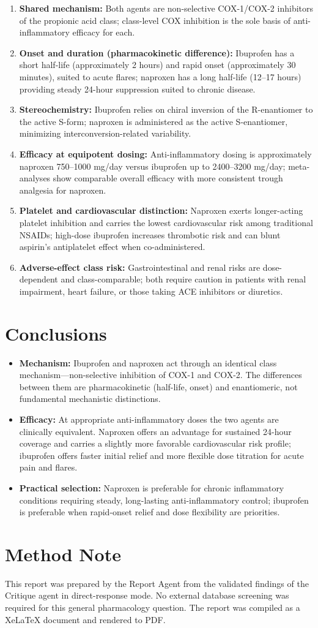 \documentclass[11pt]{article}
\begin{document}
\begin{enumerate}[leftmargin=1.6em]
\item \textbf{Shared mechanism:} Both agents are non-selective COX-1/COX-2 inhibitors of the propionic acid class; class-level COX inhibition is the sole basis of anti-inflammatory efficacy for each.
\item \textbf{Onset and duration (pharmacokinetic difference):} Ibuprofen has a short half-life (approximately 2 hours) and rapid onset (approximately 30 minutes), suited to acute flares; naproxen has a long half-life (12--17 hours) providing steady 24-hour suppression suited to chronic disease.
\item \textbf{Stereochemistry:} Ibuprofen relies on chiral inversion of the R-enantiomer to the active S-form; naproxen is administered as the active S-enantiomer, minimizing interconversion-related variability.
\item \textbf{Efficacy at equipotent dosing:} Anti-inflammatory dosing is approximately naproxen 750--1000 mg/day versus ibuprofen up to 2400--3200 mg/day; meta-analyses show comparable overall efficacy with more consistent trough analgesia for naproxen.
\item \textbf{Platelet and cardiovascular distinction:} Naproxen exerts longer-acting platelet inhibition and carries the lowest cardiovascular risk among traditional NSAIDs; high-dose ibuprofen increases thrombotic risk and can blunt aspirin's antiplatelet effect when co-administered.
\item \textbf{Adverse-effect class risk:} Gastrointestinal and renal risks are dose-dependent and class-comparable; both require caution in patients with renal impairment, heart failure, or those taking ACE inhibitors or diuretics.
\end{enumerate}

\section{Conclusions}
\begin{itemize}[leftmargin=1.4em]
\item \textbf{Mechanism:} Ibuprofen and naproxen act through an identical class mechanism---non-selective inhibition of COX-1 and COX-2. The differences between them are pharmacokinetic (half-life, onset) and enantiomeric, not fundamental mechanistic distinctions.
\item \textbf{Efficacy:} At appropriate anti-inflammatory doses the two agents are clinically equivalent. Naproxen offers an advantage for sustained 24-hour coverage and carries a slightly more favorable cardiovascular risk profile; ibuprofen offers faster initial relief and more flexible dose titration for acute pain and flares.
\item \textbf{Practical selection:} Naproxen is preferable for chronic inflammatory conditions requiring steady, long-lasting anti-inflammatory control; ibuprofen is preferable when rapid-onset relief and dose flexibility are priorities.
\end{itemize}

\section*{Method Note}
This report was prepared by the Report Agent from the validated findings of the Critique agent in direct-response mode. No external database screening was required for this general pharmacology question. The report was compiled as a XeLaTeX document and rendered to PDF.
\end{document}
